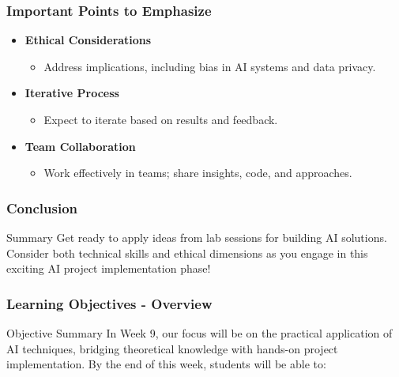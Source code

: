 \documentclass[aspectratio=169]{beamer}
\begin{document}
\begin{frame}[fragile]
    \frametitle{Important Points to Emphasize}
    \begin{itemize}
        \item \textbf{Ethical Considerations}
            \begin{itemize}
                \item Address implications, including bias in AI systems and data privacy.
            \end{itemize}
        \item \textbf{Iterative Process}
            \begin{itemize}
                \item Expect to iterate based on results and feedback.
            \end{itemize}
        \item \textbf{Team Collaboration}
            \begin{itemize}
                \item Work effectively in teams; share insights, code, and approaches.
            \end{itemize}
    \end{itemize}
\end{frame}

\begin{frame}[fragile]
    \frametitle{Conclusion}
    \begin{block}{Summary}
        Get ready to apply ideas from lab sessions for building AI solutions. Consider both technical skills and ethical dimensions as you engage in this exciting AI project implementation phase!
    \end{block}
\end{frame}

\begin{frame}[fragile]
    \frametitle{Learning Objectives - Overview}
    \begin{block}{Objective Summary}
        In Week 9, our focus will be on the practical application of AI techniques, bridging theoretical knowledge with hands-on project implementation. By the end of this week, students will be able to:
    \end{block}
\end{frame}
\end{document}
